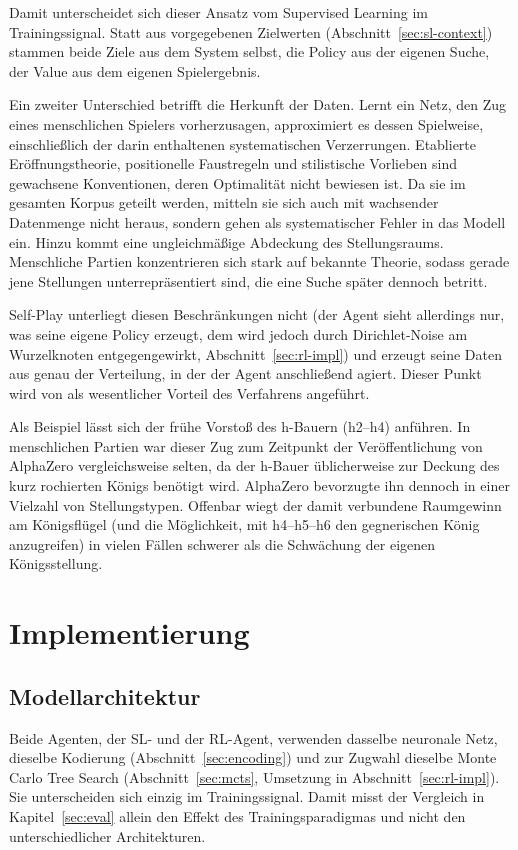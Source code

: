 \documentclass[
  a4paper, 12pt,
  parskip=half,
  headings=small,
  bibliography=totoc
]{scrartcl}
\begin{document}
Damit unterscheidet sich dieser Ansatz vom Supervised Learning im Trainingssignal. Statt aus vorgegebenen Zielwerten (Abschnitt~\ref{sec:sl-context}) stammen beide Ziele aus dem System selbst, die Policy aus der eigenen Suche, der Value aus dem eigenen Spielergebnis.

Ein zweiter Unterschied betrifft die Herkunft der Daten. Lernt ein Netz, den Zug eines menschlichen Spielers vorherzusagen, approximiert es dessen Spielweise, einschließlich der darin enthaltenen systematischen Verzerrungen. Etablierte Eröffnungstheorie, positionelle Faustregeln und stilistische Vorlieben sind gewachsene Konventionen, deren Optimalität nicht bewiesen ist. Da sie im gesamten Korpus geteilt werden, mitteln sie sich auch mit wachsender Datenmenge nicht heraus, sondern gehen als systematischer Fehler in das Modell ein. 
Hinzu kommt eine ungleichmäßige Abdeckung des Stellungsraums. Menschliche Partien konzentrieren sich stark auf bekannte Theorie, sodass gerade jene Stellungen unterrepräsentiert sind, die eine Suche später dennoch betritt. 

Self-Play unterliegt diesen Beschränkungen nicht (der Agent sieht allerdings nur, was seine eigene Policy erzeugt, dem wird jedoch durch Dirichlet-Noise am Wurzelknoten entgegengewirkt, Abschnitt~\ref{sec:rl-impl}) und erzeugt seine Daten aus genau der Verteilung, in der der Agent anschließend agiert. Dieser Punkt wird von \textcite{silver2017mastering} als wesentlicher Vorteil des Verfahrens angeführt.

Als Beispiel lässt sich der frühe Vorstoß des h-Bauern (h2--h4) anführen. In
menschlichen Partien war dieser Zug zum Zeitpunkt der Veröffentlichung von
AlphaZero vergleichsweise selten, da der h-Bauer üblicherweise zur Deckung des
kurz rochierten Königs benötigt wird. AlphaZero bevorzugte ihn dennoch in einer
Vielzahl von Stellungstypen. Offenbar wiegt der damit verbundene Raumgewinn am
Königsflügel (und die Möglichkeit, mit h4--h5--h6 den gegnerischen König anzugreifen) in vielen Fällen schwerer als die Schwächung der eigenen
Königsstellung.


\section{Implementierung}

\subsection{Modellarchitektur}\label{sec:arch} %
Beide Agenten, der SL- und der RL-Agent, verwenden
dasselbe neuronale Netz, dieselbe Kodierung (Abschnitt~\ref{sec:encoding}) und zur
Zugwahl dieselbe Monte Carlo Tree Search (Abschnitt~\ref{sec:mcts}, Umsetzung in
Abschnitt~\ref{sec:rl-impl}). Sie unterscheiden sich einzig im Trainingssignal.
Damit misst der Vergleich in Kapitel~\ref{sec:eval} allein den Effekt des
Trainingsparadigmas und nicht den unterschiedlicher Architekturen.
\end{document}
